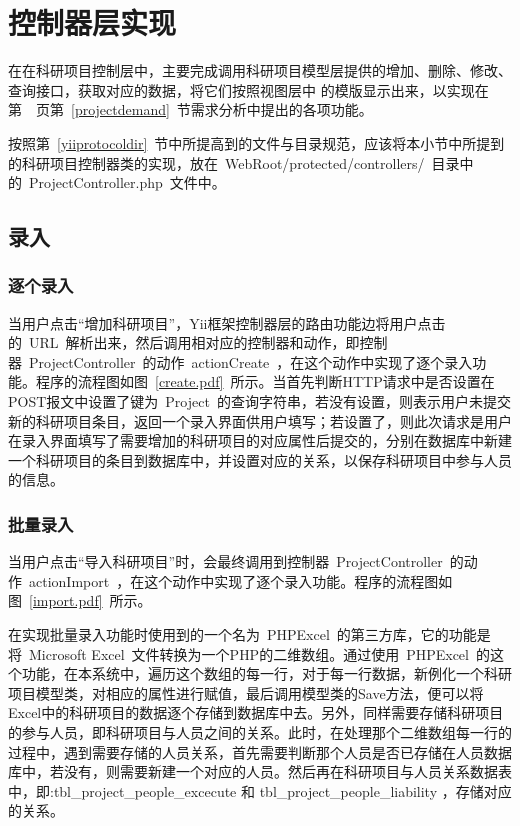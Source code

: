 
\section{控制器层实现}

在在科研项目控制层中，主要完成调用科研项目模型层提供的增加、删除、修改、查询接口，获取对应的数据，将它们按照视图层中
的模版显示出来，以实现在第~\pageref{projectdemand}~页第~\ref{projectdemand}~节需求分析中提出的各项功能。

按照第~\ref{yiiprotocoldir}~节中所提高到的文件与目录规范，应该将本小节中所提到的科研项目控制器类的实现，放在~WebRoot/protected/controllers/~目录中的~ProjectController.php~文件中。

\subsection{录入}
\subsubsection{逐个录入}
\label{controllercreate}
当用户点击“增加科研项目”，Yii框架控制器层的路由功能边将用户点击的~URL~解析出来，然后调用相对应的控制器和动作，即控制器~ProjectController~的动作~actionCreate~，在这个动作中实现了逐个录入功能。程序的流程图如图~\ref{create.pdf}~所示。当首先判断HTTP请求中是否设置在POST报文中设置了键为~Project~的查询字符串，若没有设置，则表示用户未提交新的科研项目条目，返回一个录入界面供用户填写；若设置了，则此次请求是用户在录入界面填写了需要增加的科研项目的对应属性后提交的，分别在数据库中新建一个科研项目的条目到数据库中，并设置对应的关系，以保存科研项目中参与人员的信息。


\subsubsection{批量录入}
当用户点击“导入科研项目”时，会最终调用到控制器~ProjectController~的动作~actionImport~，在这个动作中实现了逐个录入功能。程序的流程图如图~\ref{import.pdf}~所示。

在实现批量录入功能时使用到的一个名为~PHPExcel~的第三方库，它的功能是将~Microsoft Excel~文件转换为一个PHP的二维数组。通过使用~PHPExcel~的这个功能，在本系统中，遍历这个数组的每一行，对于每一行数据，新例化一个科研项目模型类，对相应的属性进行赋值，最后调用模型类的Save方法，便可以将Excel中的科研项目的数据逐个存储到数据库中去。另外，同样需要存储科研项目的参与人员，即科研项目与人员之间的关系。此时，在处理那个二维数组每一行的过程中，遇到需要存储的人员关系，首先需要判断那个人员是否已存储在人员数据库中，若没有，则需要新建一个对应的人员。然后再在科研项目与人员关系数据表中，即:tbl\_project\_people\_excecute 和 tbl\_project\_people\_liability ，存储对应的关系。

